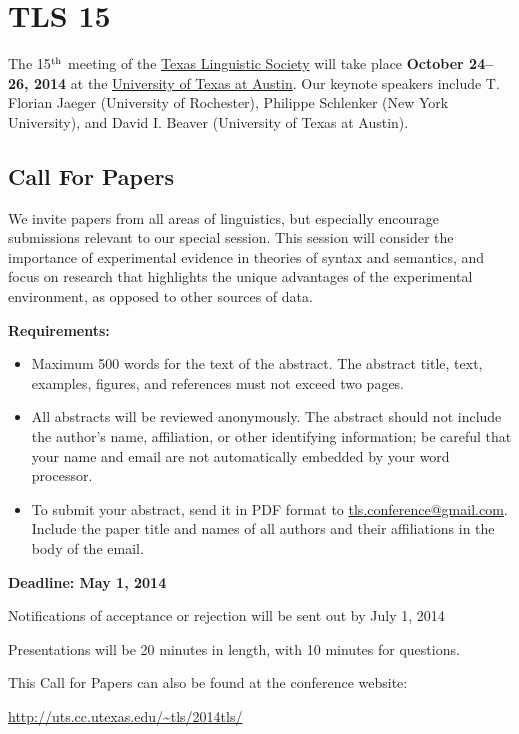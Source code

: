 \documentclass[11pt]{article}
\begin{document}
\clearpage\thispagestyle{empty}

\section*{TLS 15}

The 15$^{\rm th}$ meeting of the \href{http://uts.cc.utexas.edu/~tls}{Texas Linguistic Society} will take place \textbf{October 24--26, 2014} at the \href{https://www.utexas.edu/cola/depts/linguistics/}{University of Texas at Austin}. Our keynote speakers include T. Florian Jaeger (University of Rochester), Philippe Schlenker (New York University), and David I. Beaver (University of Texas at Austin).

\subsection*{Call For Papers}

We invite papers from all areas of linguistics, but especially encourage submissions relevant to our special session.
This session will consider the importance of experimental evidence in theories of syntax and semantics, and focus on research that highlights the unique advantages of the experimental environment, as opposed to other sources of data.

\bigskip\noindent
\textbf{Requirements:}

\begin{itemize}
  \item Maximum 500 words for the text of the abstract. The abstract title, text, examples, figures, and references must not exceed two pages.
  \item All abstracts will be reviewed anonymously. The abstract should not include the author’s name, affiliation, or other identifying information; be careful that your name and email are not automatically embedded by your word processor.
  \item To submit your abstract, send it in PDF format to \href{mailto:tls.conference@gmail.com}{tls.conference@gmail.com}. Include the paper title and names of all authors and their affiliations in the body of the email.
\end{itemize}

\textbf{Deadline: May 1, 2014}

\bigskip\noindent
Notifications of acceptance or rejection will be sent out by July 1, 2014

\medskip\noindent
Presentations will be 20 minutes in length, with 10 minutes for questions.

\medskip\noindent
This Call for Papers can also be found at the conference website:

\medskip
\url{http://uts.cc.utexas.edu/~tls/2014tls/}
\end{document}
